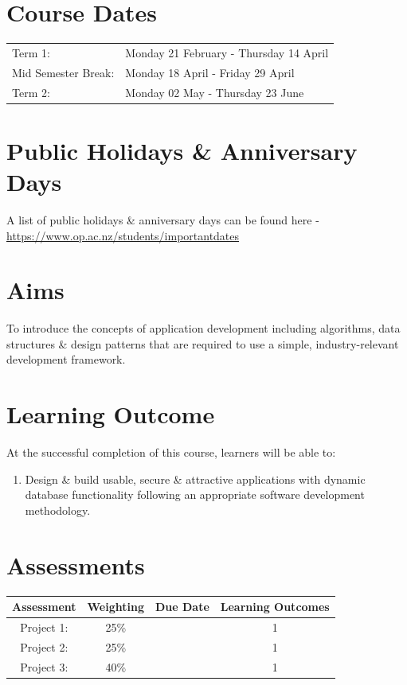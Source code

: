 \documentclass{article}
\begin{document}
\section*{Course Dates}
\begin{tabular}{ll}
	Term 1:             & Monday 21 February - Thursday 14 April \\
	Mid Semester Break: & Monday 18 April - Friday 29 April      \\
	Term 2:             & Monday 02 May - Thursday 23 June       \\
\end{tabular}

\section*{Public Holidays \& Anniversary Days}
A list of public holidays \& anniversary days can be found here - \href{https://www.op.ac.nz/students/importantdates}{https://www.op.ac.nz/students/importantdates}

\section*{Aims}
To introduce the concepts of application development including algorithms, data structures \& design patterns that are required to use a simple, industry-relevant development framework.

\section*{Learning Outcome}
At the successful completion of this course, learners will be able to:
\begin{enumerate}
	\item Design \& build usable, secure \& attractive applications with dynamic database functionality following an appropriate software development methodology.
\end{enumerate}

\section*{Assessments}
\renewcommand{\arraystretch}{1.5}
\begin{tabular}{|c|c|c|c|}
	\hline
	\textbf{Assessment}                                 & \textbf{Weighting} & \textbf{Due Date}            & \textbf{Learning Outcomes} \\ \hline
	\small Project 1:  & \small 25\%        & \small    & \small 1                   \\ \hline
	\small Project 2:                  & \small 25\%        & \small  & \small 1                   \\ \hline
	\small Project 3:                         & \small 40\%        & \small   & \small 1                   \\ \hline
\end{tabular}
\end{document}
